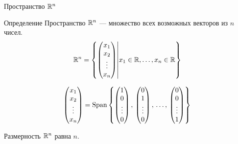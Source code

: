 \begin{frame}{Пространство $\mathbb{R}^n$}
\begin{block}{Определение} 
\alert{Пространство $\mathbb{R}^n$} — множество всех возможных векторов из $n$ чисел. 
 \[
 \mathbb{R}^n = \left\{ \begin{pmatrix}
 x_1 \\
 x_2 \\
 \vdots \\
 x_n \\
 \end{pmatrix} \middle| x_1 \in \mathbb{R}, \ldots, x_n \in \mathbb{R}
   \right\}  
 \]
\end{block}
\pause
\[
  \begin{pmatrix}
  x_1 \\
  x_2 \\
  \vdots \\
  x_n \\
  \end{pmatrix} = \operatorname{Span}\left\{
\begin{pmatrix}
1 \\
0 \\
\vdots \\
0 \\
\end{pmatrix}, \,
\begin{pmatrix}
0 \\
1 \\
\vdots \\
0 \\
\end{pmatrix}, \, \ldots, \,
\begin{pmatrix}
0 \\
0\\
\vdots \\
1 \\
\end{pmatrix}
\right\}
\]

\pause
Размерность $\mathbb{R}^n$ равна $n$. 


\end{frame}